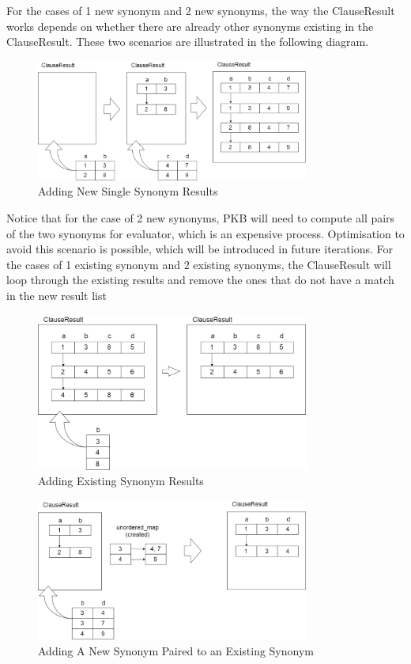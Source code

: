 \documentclass[12pt]{article}
\begin{document}
{{{{{{{{{{{{{\begin{enumerate}
\begin{table}[H]
\end{table}
For the cases of 1 new synonym and 2 new synonyms, the way the ClauseResult works depends on whether there are already other synonyms existing in the ClauseResult. These two scenarios are illustrated in the following diagram.
\begin{figure}[H]
  \centering 
  \caption{Adding New Single Synonym Results}
 \includegraphics[width=0.8\textwidth]{ClauseResult_AddTwoNew.png}
\end{figure}
Notice that for the case of 2 new synonyms, PKB will need to compute all pairs of the two synonyms for evaluator, which is an expensive process. Optimisation to avoid this scenario is possible, which will be introduced in future iterations. \newline For the cases of 1 existing synonym and 2 existing synonyms, the ClauseResult will loop through the existing results and remove the ones that do not have a match in the new result list
\begin{figure}[H]
  \centering 
  \caption{Adding Existing Synonym Results}
 \includegraphics[width=0.8\textwidth]{ClauseResult_AddExistingSynonym.png}
\end{figure}
\begin{figure}[H]
  \centering 
  \caption{Adding A New Synonym Paired to an Existing Synonym}
 \includegraphics[width=0.8\textwidth]{ClauseResult_AddOneNewOneExisting.png}

\end{figure}
\end{enumerate}}}}}}}}}}}}}}
\end{document}
